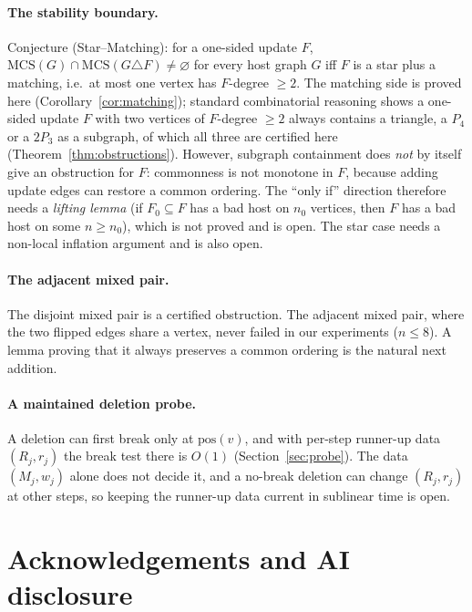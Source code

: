 \documentclass[11pt]{article}
\theoremstyle{definition}
\theoremstyle{remark}
\newcommand{\mcso}{\mathrm{MCS}}
\begin{document}
\paragraph{The stability boundary.} Conjecture (Star--Matching): for a one-sided
update $F$, $\mcso(G)\cap\mcso(G\triangle F)\neq\varnothing$ for every host graph
$G$ iff $F$ is a star plus a matching, i.e.\ at most one vertex has $F$-degree
$\ge 2$. The matching side is proved here (Corollary~\ref{cor:matching}); standard
combinatorial reasoning shows a one-sided update $F$ with two vertices of
$F$-degree $\ge 2$ always contains a triangle, a $P_4$ or a $2P_3$ as a subgraph,
of which all three are certified here (Theorem~\ref{thm:obstructions}). However,
subgraph containment does \emph{not} by itself give an obstruction for $F$:
commonness is not monotone in $F$, because adding update edges can restore a
common ordering. The ``only if'' direction therefore needs a \emph{lifting
lemma} (if $F_0\subseteq F$ has a bad host on $n_0$ vertices, then $F$ has a bad
host on some $n\ge n_0$), which is not proved and is open. The star case needs a
non-local inflation argument and is also open.

\paragraph{The adjacent mixed pair.} The disjoint mixed pair is a certified
obstruction. The adjacent mixed pair, where the two flipped edges share a vertex,
never failed in our experiments ($n\le 8$). A lemma proving that it always
preserves a common ordering is the natural next addition.

\paragraph{A maintained deletion probe.} A deletion can first break only at
$\mathrm{pos}(v)$, and with per-step runner-up data $(R_j,r_j)$ the break test
there is $O(1)$ (Section~\ref{sec:probe}). The data $(M_j,w_j)$ alone does not
decide it, and a no-break deletion can change $(R_j,r_j)$ at other steps, so
keeping the runner-up data current in sublinear time is open.

\section*{Acknowledgements and AI disclosure}
\end{document}
